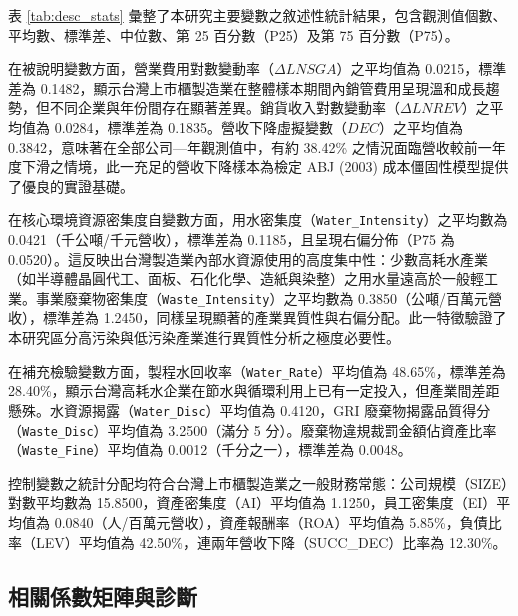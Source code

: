 \documentclass[12pt,a4paper]{article}
\begin{document}
表 \ref{tab:desc_stats} 彙整了本研究主要變數之敘述性統計結果，包含觀測值個數、平均數、標準差、中位數、第 25 百分數（P25）及第 75 百分數（P75）。

在被說明變數方面，營業費用對數變動率（$\Delta LNSGA$）之平均值為 0.0215，標準差為 0.1482，顯示台灣上市櫃製造業在整體樣本期間內銷管費用呈現溫和成長趨勢，但不同企業與年份間存在顯著差異。銷貨收入對數變動率（$\Delta LNREV$）之平均值為 0.0284，標準差為 0.1835。營收下降虛擬變數（$DEC$）之平均值為 0.3842，意味著在全部公司—年觀測值中，有約 38.42\% 之情況面臨營收較前一年度下滑之情境，此一充足的營收下降樣本為檢定 ABJ (2003) 成本僵固性模型提供了優良的實證基礎。

在核心環境資源密集度自變數方面，用水密集度（\texttt{Water\_Intensity}）之平均數為 0.0421（千公噸/千元營收），標準差為 0.1185，且呈現右偏分佈（P75 為 0.0520）。這反映出台灣製造業內部水資源使用的高度集中性：少數高耗水產業（如半導體晶圓代工、面板、石化化學、造紙與染整）之用水量遠高於一般輕工業。事業廢棄物密集度（\texttt{Waste\_Intensity}）之平均數為 0.3850（公噸/百萬元營收），標準差為 1.2450，同樣呈現顯著的產業異質性與右偏分配。此一特徵驗證了本研究區分高污染與低污染產業進行異質性分析之極度必要性。

在補充檢驗變數方面，製程水回收率（\texttt{Water\_Rate}）平均值為 48.65\%，標準差為 28.40\%，顯示台灣高耗水企業在節水與循環利用上已有一定投入，但產業間差距懸殊。水資源揭露（\texttt{Water\_Disc}）平均值為 0.4120，GRI 廢棄物揭露品質得分（\texttt{Waste\_Disc}）平均值為 3.2500（滿分 5 分）。廢棄物違規裁罰金額佔資產比率（\texttt{Waste\_Fine}）平均值為 0.0012（千分之一），標準差為 0.0048。

控制變數之統計分配均符合台灣上市櫃製造業之一般財務常態：公司規模（SIZE）對數平均數為 15.8500，資產密集度（AI）平均值為 1.1250，員工密集度（EI）平均值為 0.0840（人/百萬元營收），資產報酬率（ROA）平均值為 5.85\%，負債比率（LEV）平均值為 42.50\%，連兩年營收下降（SUCC\_DEC）比率為 12.30\%。

\subsection{相關係數矩陣與診斷}
\end{document}
